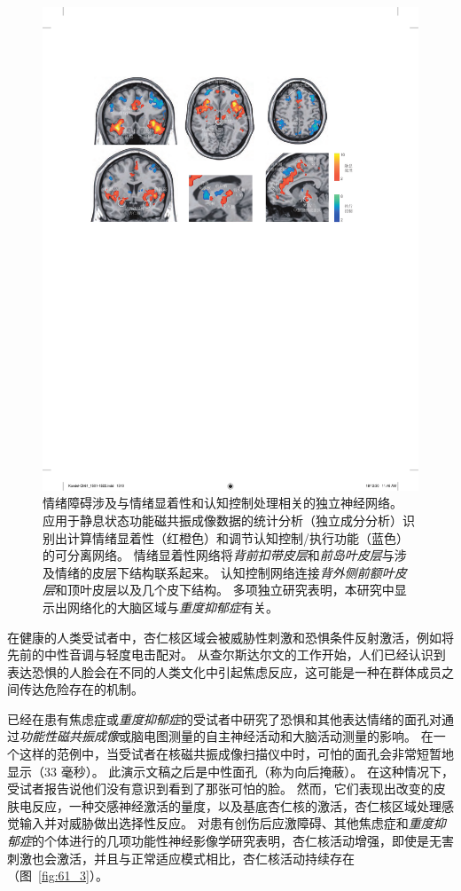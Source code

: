 \begin{figure}[htbp]
	\centering
	\includegraphics[width=1.0\linewidth]{chap61/fig_61_2}
	\caption{情绪障碍涉及与情绪显着性和认知控制处理相关的独立神经网络。
		应用于静息状态功能磁共振成像数据的统计分析（独立成分分析）识别出计算情绪显着性（红橙色）和调节认知控制/执行功能（蓝色）的可分离网络。
		情绪显着性网络将\textit{背前扣带皮层}和\textit{前岛叶皮层}与涉及情绪的皮层下结构联系起来。
		认知控制网络连接\textit{背外侧前额叶皮层}和顶叶皮层以及几个皮下结构。
		多项独立研究表明，本研究中显示出网络化的大脑区域与\textit{重度抑郁症}有关\cite{seeley2007dissociable}。}
	\label{fig:61_2}
\end{figure}


在健康的人类受试者中，杏仁核区域会被威胁性刺激和恐惧条件反射激活，例如将先前的中性音调与轻度电击配对。
从查尔斯达尔文的工作开始，人们已经认识到表达恐惧的人脸会在不同的人类文化中引起焦虑反应，这可能是一种在群体成员之间传达危险存在的机制。


已经在患有焦虑症或\textit{重度抑郁症}的受试者中研究了恐惧和其他表达情绪的面孔对通过\textit{功能性磁共振成像}或脑电图测量的自主神经活动和大脑活动测量的影响。
在一个这样的范例中，当受试者在核磁共振成像扫描仪中时，可怕的面孔会非常短暂地显示（33 毫秒）。
此演示文稿之后是中性面孔（称为向后掩蔽）。
在这种情况下，受试者报告说他们没有意识到看到了那张可怕的脸。
然而，它们表现出改变的皮肤电反应，一种交感神经激活的量度，以及基底杏仁核的激活，杏仁核区域处理感觉输入并对威胁做出选择性反应。
对患有创伤后应激障碍、其他焦虑症和\textit{重度抑郁症}的个体进行的几项功能性神经影像学研究表明，杏仁核活动增强，即使是无害刺激也会激活，并且与正常适应模式相比，杏仁核活动持续存在（图~\ref{fig:61_3}）。



